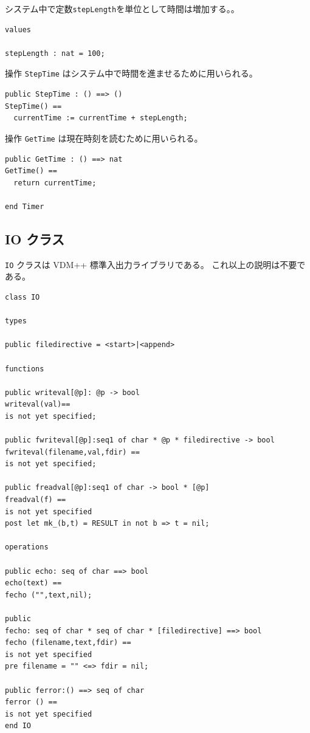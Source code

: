 \documentclass[\pformat,12pt]{jreport}
\begin{document}
システム中で定数\texttt{stepLength}を単位として時間は増加する。。

\begin{lstlisting}
values

stepLength : nat = 100;
\end{lstlisting}

操作 \texttt{StepTime} はシステム中で時間を進ませるために用いられる。

\begin{lstlisting}
public StepTime : () ==> ()
StepTime() ==
  currentTime := currentTime + stepLength;
\end{lstlisting}

操作 \texttt{GetTime} は現在時刻を読むために用いられる。

\begin{lstlisting}
public GetTime : () ==> nat
GetTime() ==
  return currentTime;

end Timer
\end{lstlisting}

\subsection{IO クラス}

 \texttt{IO} クラスは VDM++ 標準入出力ライブラリである。
これ以上の説明は不要である。

\begin{lstlisting}
class IO

types

public filedirective = <start>|<append>

functions

public writeval[@p]: @p -> bool
writeval(val)==
is not yet specified;

public fwriteval[@p]:seq1 of char * @p * filedirective -> bool
fwriteval(filename,val,fdir) ==
is not yet specified;

public freadval[@p]:seq1 of char -> bool * [@p]
freadval(f) ==
is not yet specified
post let mk_(b,t) = RESULT in not b => t = nil;

operations

public echo: seq of char ==> bool
echo(text) ==
fecho ("",text,nil);

public 
fecho: seq of char * seq of char * [filedirective] ==> bool
fecho (filename,text,fdir) ==
is not yet specified
pre filename = "" <=> fdir = nil;

public ferror:() ==> seq of char
ferror () ==
is not yet specified
end IO
\end{lstlisting}
\end{document}
